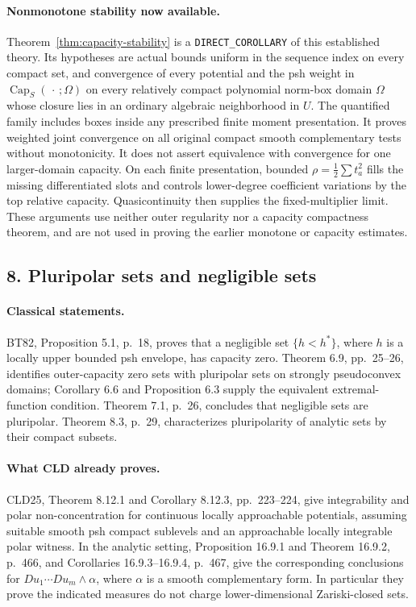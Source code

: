 \documentclass[11pt,a4paper]{article}
\numberwithin{equation}{section}
\theoremstyle{definition}
\theoremstyle{remark}
\begin{document}
\paragraph{Nonmonotone stability now available.}
Theorem~\ref{thm:capacity-stability} is a
\texttt{DIRECT\_COROLLARY} of this established theory. Its hypotheses
are actual bounds uniform in the sequence index on every compact set,
and convergence of every potential and the psh weight in
\(\operatorname{Cap}_S(\,\cdot\,;\Omega)\) on every relatively compact
polynomial norm-box domain \(\Omega\) whose closure lies in an ordinary
algebraic neighborhood in \(U\). The quantified family includes boxes
inside any prescribed finite moment presentation. It proves weighted
joint convergence on all original compact smooth complementary tests
without monotonicity. It does not assert equivalence with convergence
for one larger-domain capacity. On each finite presentation, bounded
\(\rho=\tfrac12\sum t_a^2\) fills the missing differentiated slots
and controls lower-degree coefficient variations by the top relative
capacity. Quasicontinuity then supplies the fixed-multiplier limit.
These arguments use neither outer regularity nor a capacity compactness
theorem, and are not used in proving the earlier monotone or capacity
estimates.

\subsection{8. Pluripolar sets and negligible sets}

\paragraph{Classical statements.}
BT82, Proposition 5.1, p.~18, proves that a negligible set
\(\{h<h^*\}\), where \(h\) is a locally upper bounded psh envelope,
has capacity zero. Theorem 6.9, pp.~25--26, identifies outer-capacity
zero sets with pluripolar sets on strongly pseudoconvex domains;
Corollary 6.6 and Proposition 6.3 supply the equivalent extremal-function
condition. Theorem 7.1, p.~26, concludes that negligible sets are
pluripolar. Theorem 8.3, p.~29, characterizes pluripolarity of analytic
sets by their compact subsets.\cite[\S\S5--8]{BT82}

\paragraph{What CLD already proves.}
CLD25, Theorem 8.12.1 and Corollary 8.12.3, pp.~223--224, give
integrability and polar non-concentration for continuous locally
approachable potentials, assuming suitable smooth psh compact
sublevels and an approachable locally integrable polar witness. In the
analytic setting, Proposition 16.9.1 and Theorem 16.9.2,
p.~466, and Corollaries 16.9.3--16.9.4, p.~467, give the corresponding
conclusions for \(Du_1\cdots Du_m\wedge\alpha\), where \(\alpha\)
is a smooth complementary form. In particular they prove the indicated
measures do not charge lower-dimensional Zariski-closed sets.
\cite[\S8.12, \S16.9]{CLD25}
\end{document}

